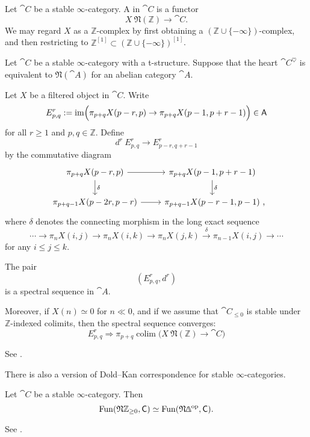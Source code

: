 \begin{definition}
    Let $\cat{C}$ be a stable $\infty$-category.
    A  in $\cat{C}$ is a functor 
    \[X\:\mathfrak N(\mathbb{Z})\to\cat{C}.\]
    We may regard $X$ as a $\mathbb{Z}$-complex
    by first obtaining a $(\mathbb{Z}\cup\{-\infty\})$-complex,
    and then restricting to $\mathbb{Z}^{[1]}\subset(\mathbb{Z}\cup\{-\infty\})^{[1]}$.
\end{definition}

Let $\cat{C}$ be a stable $\infty$-category with a t-structure.
Suppose that the heart $\cat{C}^\heartsuit$ 
is equivalent to $\mathfrak{N}(\cat{A})$ for an abelian category $\cat{A}$.

Let $X$ be a filtered object in $\cat{C}$.
Write
\[E^r_{p,q}:=\operatorname{im}\Bigl(
    \pi_{p+q}X(p-r,p)\to\pi_{p+q}X(p-1,p+r-1)
\Bigr)\in\mathsf{A}\]
for all $r\geq1$ and $p,q\in\mathbb{Z}$.
Define 
\[d^r\:E^r_{p,q}\to E^r_{p-r,q+r-1}\]
by the commutative diagram 
\[\begin{tikzcd}
    \pi_{p+q}X(p-r,p)\ar[r]\ar[d,"\delta"] & \pi_{p+q}X(p-1,p+r-1)\ar[d,"\delta"] \\
    \pi_{p+q-1}X(p-2r,p-r)\ar[r] & \pi_{p+q-1}X(p-r-1,p-1)\rlap{\ ,}
\end{tikzcd}\]
where $\delta$ denotes the connecting morphism in the long exact sequence 
\[\cdots\to\pi_nX(i,j)\to\pi_nX(i,k)\to\pi_nX(j,k)\xrightarrow{\delta}\pi_{n-1}X(i,j)\to\cdots\]
for any $i\leq j\leq k$.

\begin{theorem}
    The pair 
    \[ (E^r_{p,q},d^r) \]
    is a spectral sequence in $\cat{A}$.

    Moreover, if $X(n)\simeq0$ for $n\ll0$, 
    and if we assume that $\cat{C}_{\leq0}$
    is stable under $\mathbb{Z}$-indexed colimits,
    then the spectral sequence converges:
    \[ E^r_{p,q}\Rightarrow\pi_{p+q}\operatorname{colim}
    \bigl(X\:\mathfrak{N}(\mathbb{Z})\to\cat{C}\bigr) \]
\end{theorem}

See \cite[Propositions 1.2.2.7~and~1.2.2.14]{ha}.

There is also a version of Dold--Kan correspondence
for stable $\infty$-categories.

\begin{theorem}
    Let $\cat{C}$ be a stable $\infty$-category. Then 
    \[\operatorname{Fun}(\mathfrak{N}\mathbb{Z}_{\geq0},\cat{C})
    \simeq\operatorname{Fun}(\mathfrak{N}\bfDelta\op,\cat{C}).\]
\end{theorem}

See \cite[Theorem~1.2.4.1]{ha}.
